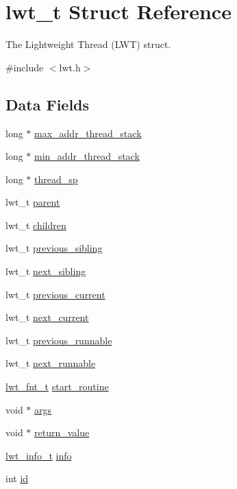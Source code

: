 \hypertarget{structlwt}{\section{lwt\+\_\+t Struct Reference}
\label{structlwt}
}


The Lightweight Thread (L\+W\+T) struct.  




{\ttfamily \#include $<$lwt.\+h$>$}

\subsection*{Data Fields}
\begin{DoxyCompactItemize}
\item 
long $\ast$ \hyperlink{structlwt_ae97cdce617ee026378588f57a999f972}{max\+\_\+addr\+\_\+thread\+\_\+stack}
\item 
long $\ast$ \hyperlink{structlwt_a62ea9a882e0a197b9b076e1e018048d7}{min\+\_\+addr\+\_\+thread\+\_\+stack}
\item 
long $\ast$ \hyperlink{structlwt_aba48cdf2f962d7ededf74923ddd33ea1}{thread\+\_\+sp}
\item 
lwt\+\_\+t \hyperlink{structlwt_a1849cde569fc8f254db05365de570b0e}{parent}
\item 
lwt\+\_\+t \hyperlink{structlwt_a33d2fa8a95fe7c0deb7c7723bd4af344}{children}
\item 
lwt\+\_\+t \hyperlink{structlwt_a28f05f6ebc974d92415a55b8e190670e}{previous\+\_\+sibling}
\item 
lwt\+\_\+t \hyperlink{structlwt_a5557ab4e2bdd3634b38f5035461767d6}{next\+\_\+sibling}
\item 
lwt\+\_\+t \hyperlink{structlwt_afe18cb4e9b5f4c60289674d2298993a2}{previous\+\_\+current}
\item 
lwt\+\_\+t \hyperlink{structlwt_a96a9b5218a20b704188442a3056601ae}{next\+\_\+current}
\item 
lwt\+\_\+t \hyperlink{structlwt_acb89e009a8cb87cbd5d71ab5ca08911b}{previous\+\_\+runnable}
\item 
lwt\+\_\+t \hyperlink{structlwt_a1636aae4155df6a60c90c7ab737687e4}{next\+\_\+runnable}
\item 
\hyperlink{lwt_8h_a58d5112b6c76cbcd033e124f6131a51a}{lwt\+\_\+fnt\+\_\+t} \hyperlink{structlwt_acdcfc344e943154b9d3d11e1a41cb9f1}{start\+\_\+routine}
\item 
void $\ast$ \hyperlink{structlwt_a6e870b21b996bc5c62b6cbd04328e784}{args}
\item 
void $\ast$ \hyperlink{structlwt_a22ac5beef8503481294035218e73c3ef}{return\+\_\+value}
\item 
\hyperlink{lwt_8h_a1148b40d53237025b24f0b603b387e75}{lwt\+\_\+info\+\_\+t} \hyperlink{structlwt_a40641e751624b983f5e1ae5302210e5d}{info}
\item 
int \hyperlink{structlwt_aa3df3d76d606756e38bb9bd3d2c2d241}{id}
\end{DoxyCompactItemize}


